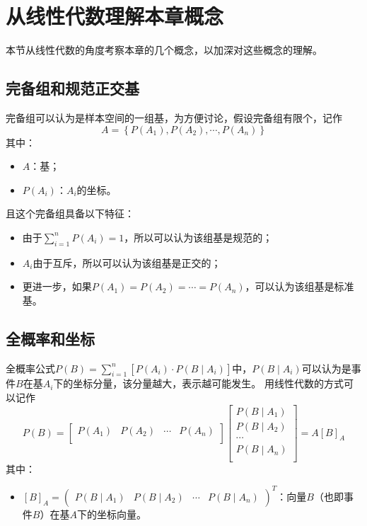 \section{从线性代数理解本章概念}

本节从线性代数的角度考察本章的几个概念，以加深对这些概念的理解。

\subsection{完备组和规范正交基}

完备组可以认为是样本空间的一组基，为方便讨论，假设完备组有限个，记作
\[
A=\left\{ P\left( A_1 \right) ,P\left( A_2 \right) ,\cdots ,P\left( A_n \right) \right\}
\]
其中：
\begin{itemize}
    \item $A$：基；
    \item $P\left( A_i \right) $：$A_i$的坐标。
\end{itemize}
且这个完备组具备以下特征：
\begin{itemize}
    \item 由于$\sum_{i=1}^n{P\left( A_i \right)}=1$，所以可以认为该组基是规范的；
    \item $A_i$由于互斥，所以可以认为该组基是正交的；
    \item 更进一步，如果$P\left( A_1 \right) =P\left( A_2 \right) =\cdots =P\left( A_n \right) $，可以认为该组基是标准基。
\end{itemize}


\subsection{全概率和坐标}

全概率公式$P\left( B \right) =\sum_{i=1}^n{\left[ P\left( A_i \right) \cdot P\left( B \middle| A_i \right) \right]} $中，$P\left( B \middle| A_i \right) $可以认为是事件$B$在基$A_i$下的坐标分量，该分量越大，表示越可能发生。
用线性代数的方式可以记作
\[
P\left( B \right) =\left[ \begin{matrix}
	P\left( A_1 \right)&		P\left( A_2 \right)&		\cdots&		P\left( A_n \right)\\
\end{matrix} \right] \left[ \begin{array}{c}
	P\left( B \middle| A_1 \right)\\
	P\left( B \middle| A_2 \right)\\
	\cdots\\
	P\left( B \middle| A_n \right)\\
\end{array} \right] =A\left[ B \right] _A
\]
其中：
\begin{itemize}
    \item $\left[ B \right] _A=\left( \begin{matrix} P\left( B \middle| A_1 \right)&		P\left( B \middle| A_2 \right)&		\cdots&		P\left( B \middle| A_n \right) \end{matrix} \right) ^T$：向量$B$（也即事件$B$）在基$A$下的坐标向量。
\end{itemize}

